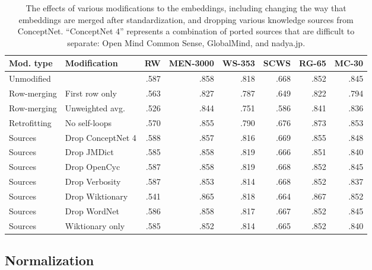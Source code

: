 \documentclass[letterpaper]{article}
\begin{document}
\begin{table*}[t]
\centering
\begin{tabular}{llrrrrrr}
\toprule
Mod. type       & Modification        &   RW &  MEN-3000 &  WS-353 &  SCWS &  RG-65 &  MC-30 \\
\midrule
Unmodified      &                     & .587 &      .858 &    .818 &  .668 &   .852 &   .845 \\
\midrule
Row-merging     & First row only      & .563 &      .827 &    .787 &  .649 &   .822 &   .794 \\
Row-merging     & Unweighted avg.     & .526 &      .844 &    .751 &  .586 &   .841 &   .836 \\
Retrofitting    & No self-loops       & .570 &      .855 &    .790 &  .676 &   .873 &   .853 \\
Sources         & Drop ConceptNet 4   & .588 &      .857 &    .816 &  .669 &   .855 &   .848 \\
Sources         & Drop JMDict         & .585 &      .858 &    .819 &  .666 &   .851 &   .840 \\
Sources         & Drop OpenCyc        & .587 &      .858 &    .819 &  .668 &   .852 &   .845 \\
Sources         & Drop Verbosity      & .587 &      .853 &    .814 &  .668 &   .852 &   .837 \\
Sources         & Drop Wiktionary     & .541 &      .865 &    .818 &  .664 &   .867 &   .852 \\
Sources         & Drop WordNet        & .586 &      .858 &    .817 &  .667 &   .852 &   .845 \\
Sources         & Wiktionary only     & .585 &      .852 &    .814 &  .665 &   .852 &   .840 \\
\bottomrule
\end{tabular}
\caption{
    The effects of various modifications to the embeddings, including
    changing the way that embeddings are merged after standardization, and
    dropping various knowledge sources from ConceptNet. ``ConceptNet 4''
    represents a combination of ported sources that are difficult to
    separate: Open Mind Common Sense, GlobalMind, and nadya.jp.
}
\label{eval-variations}
\end{table*}

\subsection{Normalization}
\end{document}
